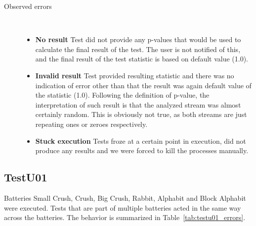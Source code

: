 \documentclass[
	digital,    %
	oneside,    %
	color,
	11pt,
	nocover,
	notable,
	nolof,
	nolot,
]{fithesis3}
\newenvironment{titlemize}[1]
{
	\begin{description}
	\item[#1]\
	\begin{itemize}
}
{
	\end{itemize}
 	\end{description}
}
\theoremstyle{definition}
\theoremstyle{remark}
\begin{document}
\begin{titlemize}{Observed errors}
\item \textbf{No result} Test did not provide any p-values that would be used to calculate the final result of the test. The user is not notified of this, and the final result of the test statistic is based on default value (1.0).
\item \textbf{Invalid result} Test provided resulting statistic and there was no indication of error other than that the result was again default value of the statistic (1.0). Following the definition of p-value, the interpretation of such result is that the analyzed stream was almost certainly random. This is obviously not true, as both streams are just repeating ones or zeroes respectively. 
\item \textbf{Stuck execution} Tests froze at a certain point in execution, did not produce any results and we were forced to kill the processes manually.
\end{titlemize}

\subsection*{TestU01}
Batteries Small Crush, Crush, Big Crush, Rabbit, Alphabit and Block Alphabit were executed. Tests that are part of multiple batteries acted in the same way across the batteries. The behavior is summarized in Table~\ref{tab:testu01_errors}.
\end{document}
